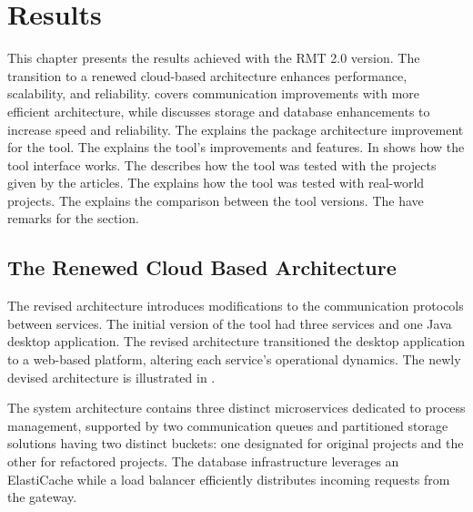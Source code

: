 \chapter{Results}
\label{results}
This chapter presents the results achieved with the RMT 2.0 version. The  transition to a renewed cloud-based architecture enhances performance, scalability, and reliability.  covers communication improvements with more efficient architecture, while  discusses storage and database enhancements to increase speed and reliability. The  explains the package architecture improvement for the tool. The  explains the tool's improvements and features. In  shows how the tool interface works. The  describes how the tool was tested with the projects given by the articles. The  explains how the tool was tested with real-world projects.
The  explains the comparison between the tool versions. The  have remarks for the section.

\section{The Renewed Cloud Based Architecture}
\label{sec-cloud}
The revised architecture introduces modifications to the communication protocols between services. The initial version of the tool had three services and one Java desktop application. The revised architecture transitioned the desktop application to a web-based platform, altering each service's operational dynamics. The newly devised architecture is illustrated in .

The system architecture contains three distinct microservices dedicated to process management, supported by two communication queues and partitioned storage solutions having two distinct buckets: one designated for original projects and the other for refactored projects. The database infrastructure leverages an ElastiCache while a load balancer efficiently distributes incoming requests from the gateway.


